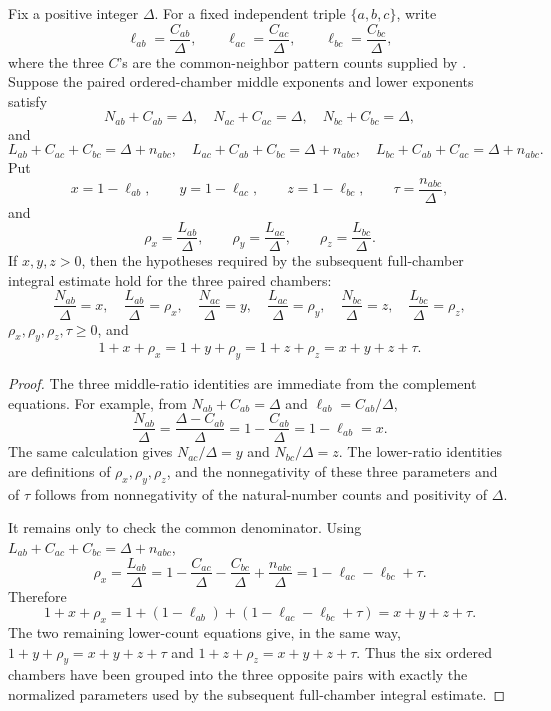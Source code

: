\begin{helper}
Fix a positive integer $\Delta$.  For a fixed independent triple
$\{a,b,c\}$, write
\[
\ell_{ab}=\frac{C_{ab}}{\Delta},\qquad
\ell_{ac}=\frac{C_{ac}}{\Delta},\qquad
\ell_{bc}=\frac{C_{bc}}{\Delta},
\]
where the three $C$'s are the common-neighbor pattern counts supplied by
.  Suppose the paired
ordered-chamber middle exponents and lower exponents satisfy
\[
N_{ab}+C_{ab}=\Delta,\quad
N_{ac}+C_{ac}=\Delta,\quad
N_{bc}+C_{bc}=\Delta,
\]
and
\[
L_{ab}+C_{ac}+C_{bc}=\Delta+n_{abc},\quad
L_{ac}+C_{ab}+C_{bc}=\Delta+n_{abc},\quad
L_{bc}+C_{ab}+C_{ac}=\Delta+n_{abc}.
\]
Put
\[
x=1-\ell_{ab},\qquad y=1-\ell_{ac},\qquad z=1-\ell_{bc},
\qquad \tau=\frac{n_{abc}}{\Delta},
\]
and
\[
\rho_x=\frac{L_{ab}}{\Delta},\qquad
\rho_y=\frac{L_{ac}}{\Delta},\qquad
\rho_z=\frac{L_{bc}}{\Delta}.
\]
If $x,y,z>0$, then the hypotheses required by the subsequent full-chamber
integral estimate hold for the three paired chambers:
\[
\frac{N_{ab}}{\Delta}=x,\quad
\frac{L_{ab}}{\Delta}=\rho_x,\quad
\frac{N_{ac}}{\Delta}=y,\quad
\frac{L_{ac}}{\Delta}=\rho_y,\quad
\frac{N_{bc}}{\Delta}=z,\quad
\frac{L_{bc}}{\Delta}=\rho_z,
\]
$\rho_x,\rho_y,\rho_z,\tau\ge0$, and
\[
1+x+\rho_x=1+y+\rho_y=1+z+\rho_z=x+y+z+\tau .
\]
\end{helper}
\begin{proof}
The three middle-ratio identities are immediate from the complement
equations.  For example, from $N_{ab}+C_{ab}=\Delta$ and
$\ell_{ab}=C_{ab}/\Delta$,
\[
\frac{N_{ab}}{\Delta}
=\frac{\Delta-C_{ab}}{\Delta}
=1-\frac{C_{ab}}{\Delta}
=1-\ell_{ab}=x.
\]
The same calculation gives $N_{ac}/\Delta=y$ and
$N_{bc}/\Delta=z$.  The lower-ratio identities are definitions of
$\rho_x,\rho_y,\rho_z$, and the nonnegativity of these three parameters
and of $\tau$ follows from nonnegativity of the natural-number counts and
positivity of $\Delta$.

It remains only to check the common denominator.  Using
$L_{ab}+C_{ac}+C_{bc}=\Delta+n_{abc}$,
\[
\rho_x
=\frac{L_{ab}}{\Delta}
=1-\frac{C_{ac}}{\Delta}-\frac{C_{bc}}{\Delta}
  +\frac{n_{abc}}{\Delta}
=1-\ell_{ac}-\ell_{bc}+\tau .
\]
Therefore
\[
1+x+\rho_x
=1+(1-\ell_{ab})+(1-\ell_{ac}-\ell_{bc}+\tau)
=x+y+z+\tau .
\]
The two remaining lower-count equations give, in the same way,
$1+y+\rho_y=x+y+z+\tau$ and
$1+z+\rho_z=x+y+z+\tau$.  Thus the six ordered chambers have been grouped
into the three opposite pairs with exactly the normalized parameters used by
the subsequent full-chamber integral estimate.
\end{proof}
